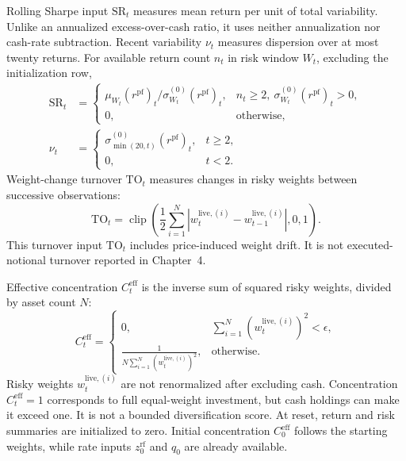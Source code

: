 Rolling Sharpe input \(\mathrm{SR}_t\) measures mean return per unit of total variability. Unlike an annualized excess-over-cash ratio, it uses neither annualization nor cash-rate subtraction. Recent variability \(\nu_t\) measures dispersion over at most twenty returns. For available return count \(n_t\) in risk window \(W_t\), excluding the initialization row,
\begin{equation}
\begin{aligned}
\mathrm{SR}_t&=
\begin{cases}
\mu_{W_t}(r^{\mathrm{pf}})_t/\sigma_{W_t}^{(0)}(r^{\mathrm{pf}})_t,
&n_t\geq2,\ \sigma_{W_t}^{(0)}(r^{\mathrm{pf}})_t>0,\\
0,&\text{otherwise},
\end{cases}\\
\nu_t&=
\begin{cases}
\sigma_{\min(20,t)}^{(0)}(r^{\mathrm{pf}})_t,&t\geq2,\\
0,&t<2.
\end{cases}
\end{aligned}
\label{eq:paa-risk-inputs}
\end{equation}
Weight-change turnover \(\mathrm{TO}_t\) measures changes in risky weights between successive observations:
\begin{equation}
\mathrm{TO}_t=\operatorname{clip}\!\left(
\frac12\sum_{i=1}^{N}|w_t^{\mathrm{live},(i)}-w_{t-1}^{\mathrm{live},(i)}|,0,1\right).
\label{eq:paa-turnover}
\end{equation}
This turnover input \(\mathrm{TO}_t\) includes price-induced weight drift. It is not executed-notional turnover reported in Chapter~4.

Effective concentration \(C_t^{\mathrm{eff}}\) is the inverse sum of squared risky weights, divided by asset count \(N\):
\begin{equation}
C_t^{\mathrm{eff}}=
\begin{cases}
0,&\sum_{i=1}^{N}(w_t^{\mathrm{live},(i)})^2<\epsilon,\\
\displaystyle\frac{1}{N\sum_{i=1}^{N}(w_t^{\mathrm{live},(i)})^2},&\text{otherwise}.
\end{cases}
\label{eq:paa-concentration}
\end{equation}
Risky weights \(w_t^{\mathrm{live},(i)}\) are not renormalized after excluding cash. Concentration \(C_t^{\mathrm{eff}}=1\) corresponds to full equal-weight investment, but cash holdings can make it exceed one. It is not a bounded diversification score. At reset, return and risk summaries are initialized to zero. Initial concentration \(C_0^{\mathrm{eff}}\) follows the starting weights, while rate inputs \(z_0^{\mathrm{rf}}\) and \(q_0\) are already available.

